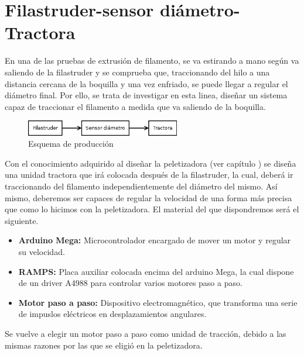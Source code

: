 \section{Filastruder-sensor diámetro-Tractora}
\label{sec:FSB}

En una de las pruebas de extrusión de filamento, se va estirando a mano según va saliendo de la filastruder y se comprueba que, traccionando del hilo a una distancia cercana de la boquilla y una vez enfriado, se puede llegar a regular el diámetro final. Por ello, se trata de investigar en esta linea, diseñar un sistema capaz de traccionar el filamento a medida que va saliendo de la boquilla.

\begin{figure}[H]
    \centering
    \includegraphics[width=0.6\textwidth]{images/producciones/Diagram2.png}
    \caption{Esquema de producción}
    \label{fig:esquemap_FST}
\end{figure}

Con el conocimiento adquirido al diseñar la peletizadora (ver capítulo ) se diseña una unidad tractora que irá colocada después de la filastruder, la cual, deberá ir traccionando del filamento independientemente del diámetro del mismo. Así mismo, deberemos ser capaces de regular la velocidad de una forma más precisa que como lo hicimos con la peletizadora. El material del que dispondremos será el siguiente.

\begin{itemize}
	\item{\textbf{Arduino Mega:} Microcontrolador encargado de mover un motor y regular su velocidad.}
	\item{\textbf{RAMPS:} Placa auxiliar colocada encima del arduino Mega, la cual dispone de un driver A4988 para controlar varios motores paso a paso.}
	\item{\textbf{Motor paso a paso:} Dispositivo electromagnético, que transforma una serie de impuslos eléctricos en desplazamientos angulares.}
\end{itemize}

Se vuelve a elegir un motor paso a paso como unidad de tracción, debido a las mismas razones por las que se eligió en la peletizadora.\\

